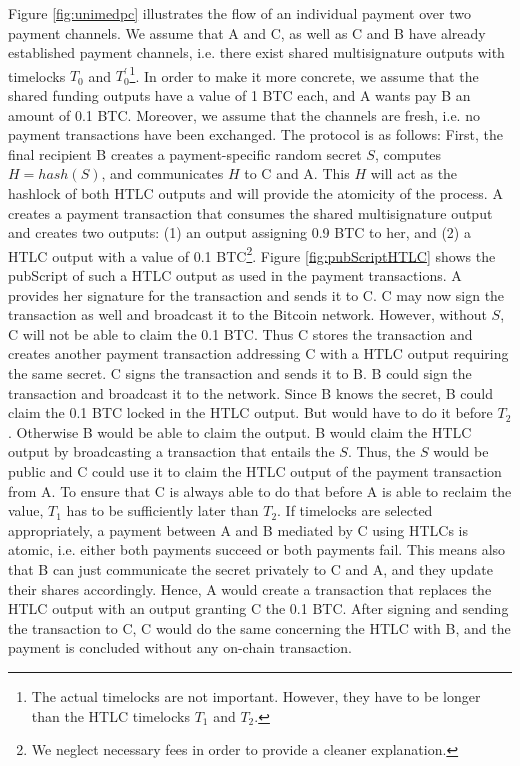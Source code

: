 Figure \ref{fig:unimedpc} illustrates the flow of an individual payment over two payment channels. We assume that A and C, as well as C and B have already established payment channels, i.e. there exist shared multisignature outputs with timelocks $T_0$ and $T_0^{'}$\footnote{The actual timelocks are not important. However, they have to be longer than the \ac{HTLC} timelocks $T_1$ and $T_2$.}. In order to make it more concrete, we assume that the shared funding outputs have a value of 1 BTC each, and A wants pay B an amount of 0.1 BTC. Moreover, we assume that the channels are fresh, i.e. no payment transactions have been exchanged. The protocol is as follows: First, the final recipient B creates a payment-specific random secret $S$, computes $H=hash(S)$, and communicates $H$ to C and A. This $H$ will act as the hashlock of both \ac{HTLC} outputs and will provide the atomicity of the process. A creates a payment transaction that consumes the shared multisignature output and creates two outputs: (1) an output assigning 0.9 BTC to her, and (2) a \ac{HTLC} output with a value of 0.1 BTC\footnote{We neglect necessary fees in order to provide a cleaner explanation.}. Figure \ref{fig:pubScriptHTLC} shows the pubScript of such a \ac{HTLC} output as used in the payment transactions. A provides her signature for the transaction and sends it to C. C may now sign the transaction as well and broadcast it to the Bitcoin network. However, without $S$, C will not be able to claim the 0.1 BTC. Thus C stores the transaction and creates another payment transaction addressing C with a \ac{HTLC} output requiring the same secret. C signs the transaction and sends it to B. B could sign the transaction and broadcast it to the network. Since B knows the secret, B could claim the 0.1 BTC locked in the \ac{HTLC} output. But would have to do it before $T_2$. Otherwise B would be able to claim the output. B would claim the \ac{HTLC} output by broadcasting a transaction that entails the $S$. Thus, the $S$ would be public and C could use it to claim the \ac{HTLC} output of the payment transaction from A. To ensure that C is always able to do that before A is able to reclaim the value, $T_1$ has to be sufficiently later than $T_2$. If timelocks are selected appropriately, a payment between A and B mediated by C using \ac{HTLC}s is atomic, i.e. either both payments succeed or both payments fail. This means also that B can just communicate the secret privately to C and A, and they update their shares accordingly. Hence, A would create a transaction that replaces the \ac{HTLC} output with an output granting C the 0.1 BTC. After signing and sending the transaction to C, C would do the same concerning the \ac{HTLC} with B, and the payment is concluded without any on-chain transaction.

